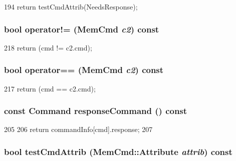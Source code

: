\begin{DoxyCode}
194 { return testCmdAttrib(NeedsResponse); }
\end{DoxyCode}
\hypertarget{classMemCmd_a2ab512e05fc51ffc4735ba5e3116aa1d}{
\subsubsection[{operator!=}]{\setlength{\rightskip}{0pt plus 5cm}bool operator!= ({\bf MemCmd} {\em c2}) const}}
\label{classMemCmd_a2ab512e05fc51ffc4735ba5e3116aa1d}



\begin{DoxyCode}
218 { return (cmd != c2.cmd); }
\end{DoxyCode}
\hypertarget{classMemCmd_a4e98d44fa893425dc7c1501dd11c8fb9}{
\subsubsection[{operator==}]{\setlength{\rightskip}{0pt plus 5cm}bool operator== ({\bf MemCmd} {\em c2}) const}}
\label{classMemCmd_a4e98d44fa893425dc7c1501dd11c8fb9}



\begin{DoxyCode}
217 { return (cmd == c2.cmd); }
\end{DoxyCode}
\hypertarget{classMemCmd_af4ef28145838bba6a01783aa0c919399}{
\subsubsection[{responseCommand}]{\setlength{\rightskip}{0pt plus 5cm}const {\bf Command} responseCommand () const}}
\label{classMemCmd_af4ef28145838bba6a01783aa0c919399}



\begin{DoxyCode}
205     {
206         return commandInfo[cmd].response;
207     }
\end{DoxyCode}
\hypertarget{classMemCmd_a7327ca4863d15af6e2f7da7d910bb4e9}{
\subsubsection[{testCmdAttrib}]{\setlength{\rightskip}{0pt plus 5cm}bool testCmdAttrib ({\bf MemCmd::Attribute} {\em attrib}) const}}
\label{classMemCmd_a7327ca4863d15af6e2f7da7d910bb4e9}



